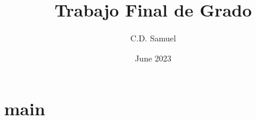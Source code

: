 \documentclass[11pt,a4paper]{memoir}
\title{Trabajo Final de Grado}
\author{C.D. Samuel}
\date{June 2023}
\begin{document}
	\nocite{*} %

	
	\clearpage
	

	\frontmatter
	\tableofcontents
	\listoffigures
	\listoftables

	\mainmatter

	\clearpage

	\section{main}{
		\blindtext[25]
	}\label{sec:main}

	\backmatter

	
	
\end{document}
